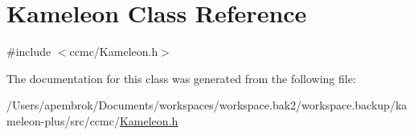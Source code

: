 \hypertarget{class_kameleon}{\section{Kameleon Class Reference}
\label{class_kameleon}
}


{\ttfamily \#include $<$ccmc/\-Kameleon.\-h$>$}



The documentation for this class was generated from the following file\-:\begin{DoxyCompactItemize}
\item 
/\-Users/apembrok/\-Documents/workspaces/workspace.\-bak2/workspace.\-backup/kameleon-\/plus/src/ccmc/\hyperlink{_kameleon_8h}{Kameleon.\-h}\end{DoxyCompactItemize}
